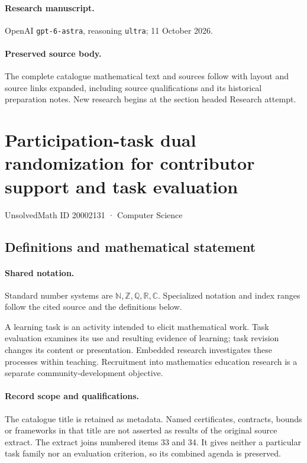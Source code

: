\documentclass[11pt]{article}
\begin{document}
\paragraph{Research manuscript.} OpenAI \texttt{gpt-6-astra}, reasoning \texttt{ultra}; 11 October 2026.
\paragraph{Preserved source body.} The complete catalogue mathematical text and sources follow with layout and source links expanded, including source qualifications and its historical preparation notes. New research begins at the section headed Research attempt.

\section{Participation-task dual randomization for contributor support and task evaluation}\label{20002131}
{\small UnsolvedMath ID 20002131 · Computer Science}
\subsection{Definitions and mathematical statement}

\paragraph{Shared notation.}Standard number systems are $\mathbb N,\mathbb Z,\mathbb Q,\mathbb R,\mathbb C$. Specialized notation and index ranges follow the cited source and the definitions below.


A learning task is an activity intended to elicit mathematical work. Task evaluation examines its use and resulting evidence of learning; task revision changes its content or presentation. Embedded research investigates these processes within teaching. Recruitment into mathematics education research is a separate community-development objective.
\paragraph{Record scope and qualifications.}
The catalogue title is retained as metadata. Named certificates, contracts, bounds or frameworks in that title are not asserted as results of the original source extract.
The extract joins numbered items 33 and 34. It gives neither a particular task family nor an evaluation criterion, so its combined agenda is preserved.
\end{document}
